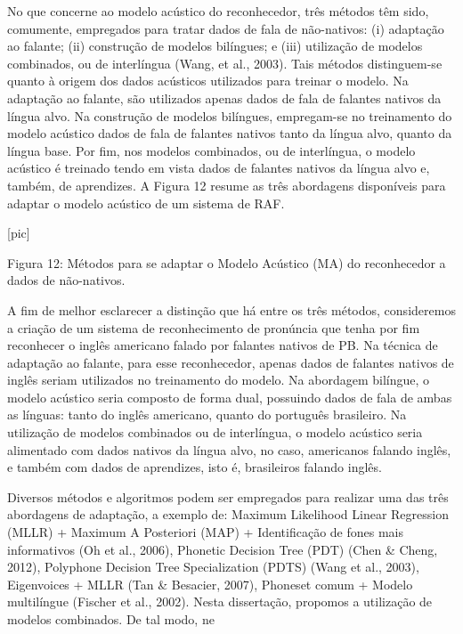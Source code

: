 No que concerne ao modelo ac\'ustico do reconhecedor, tr\^es m\'etodos t\^em
sido, comumente, empregados para tratar dados de fala de n\~ao-nativos:
(i) adapta\c{c}\~ao ao falante; (ii) constru\c{c}\~ao de modelos bil\'ingues; e (iii)
utiliza\c{c}\~ao de modelos combinados, ou de interl\'ingua (Wang, et al.,
2003). Tais m\'etodos distinguem-se quanto à origem dos dados ac\'usticos
utilizados para treinar o modelo. Na adapta\c{c}\~ao ao falante, s\~ao
utilizados apenas dados de fala de falantes nativos da l\'ingua alvo. Na
constru\c{c}\~ao de modelos bil\'ingues, empregam-se no treinamento do modelo
ac\'ustico dados de fala de falantes nativos tanto da l\'ingua alvo, quanto
da l\'ingua base. Por fim, nos modelos combinados, ou de interl\'ingua, o
modelo ac\'ustico \'e treinado tendo em vista dados de falantes nativos da
l\'ingua alvo e, tamb\'em, de aprendizes. A Figura 12 resume as tr\^es
abordagens dispon\'iveis para adaptar o modelo ac\'ustico de um sistema de
RAF.

                                [pic]

Figura 12: M\'etodos para se adaptar o Modelo Ac\'ustico (MA) do
reconhecedor a dados de n\~ao-nativos.

A fim de melhor esclarecer a distin\c{c}\~ao que h\'a entre os tr\^es m\'etodos,
consideremos a cria\c{c}\~ao de um sistema de reconhecimento de pron\'uncia que
tenha por fim reconhecer o ingl\^es americano falado por falantes nativos
de PB. Na t\'ecnica de adapta\c{c}\~ao ao falante, para esse reconhecedor,
apenas dados de falantes nativos de ingl\^es seriam utilizados no
treinamento do modelo. Na abordagem bil\'ingue, o modelo ac\'ustico seria
composto de forma dual, possuindo dados de fala de ambas as l\'inguas:
tanto do ingl\^es americano, quanto do portugu\^es brasileiro. Na utiliza\c{c}\~ao
de modelos combinados ou de interl\'ingua, o modelo ac\'ustico seria
alimentado com dados nativos da l\'ingua alvo, no caso, americanos falando
ingl\^es, e tamb\'em com dados de aprendizes, isto \'e, brasileiros falando
ingl\^es.

Diversos m\'etodos e algoritmos podem ser empregados para realizar uma das
tr\^es abordagens de adapta\c{c}\~ao, a exemplo de: Maximum Likelihood Linear
Regression (MLLR) + Maximum A Posteriori (MAP) + Identifica\c{c}\~ao de fones
mais informativos (Oh et al., 2006), Phonetic Decision Tree (PDT) (Chen
\& Cheng, 2012), Polyphone Decision Tree Specialization (PDTS) (Wang et
al., 2003), Eigenvoices + MLLR (Tan \& Besacier, 2007), Phoneset comum +
Modelo multil\'ingue (Fischer et al., 2002). Nesta disserta\c{c}\~ao, propomos a
utiliza\c{c}\~ao de modelos combinados. De tal modo, ne

